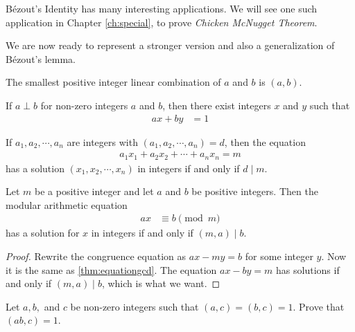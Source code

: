 B\'{e}zout's Identity has many interesting applications. We will see one such application in Chapter \ref{ch:special}, to prove \textit{Chicken McNugget Theorem}.

We are now ready to represent a stronger version and also a generalization of B\'{e}zout's lemma.

\begin{corollary}   \label{cor:strongbezout}
	The smallest positive integer linear combination of $a$ and $b$ is $(a,b)$.
\end{corollary}

\begin{corollary}  \label{cor:bezoutrelatively prime}
	If $a \perp b$ for non-zero integers $a$ and $b$, then there exist integers $x$ and $y$ such that
		\begin{align*}
			ax+by
				& = 1
		\end{align*}
\end{corollary}

\begin{theorem} 
	If $a_1, a_2, \cdots, a_n$ are integers with $(a_1, a_2, \cdots, a_n)=d$, then the equation
		\begin{align*}
			a_1x_1 + a_2x_2 + \cdots + a_n x_n = m
		\end{align*}
	has a solution $(x_1, x_2, \cdots, x_n)$ in integers if and only if $d\mid m$.
\end{theorem}

\begin{theorem}\label{thm:ax=b}
	Let $m$ be a positive integer and let $a$ and $b$ be positive integers. Then the modular arithmetic equation
	\begin{align*}
		ax
			& \equiv b \pmod m
	\end{align*}
	has a solution for $x$ in integers if and only if $(m,a)\mid b$.
\end{theorem}

\begin{proof}
	Rewrite the congruence equation as $ax-my = b$ for some integer $y$. Now it is the same as \autoref{thm:equationgcd}. The equation $ax-by=m$ has solutions if and only if $(m,a)\mid b$, which is what we want.
\end{proof}

\begin{problem}
	Let $a,b,$ and $c$ be non-zero integers such that $(a, c)=(b,c)=1$. Prove that $(ab,c)=1$.
\end{problem}

